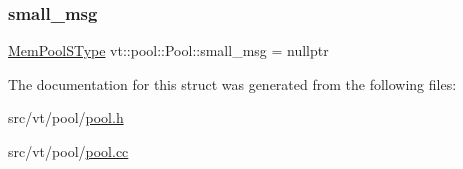 \mbox{\label{structvt_1_1pool_1_1_pool_a8f14f2f9b344882cf727200eb8d41845}} 
\subsubsection{\texorpdfstring{small\+\_\+msg}{small\_msg}}
{\footnotesize\ttfamily \hyperlink{structvt_1_1pool_1_1_pool_a9f94985824d12c43357cfe50eaaefd38}{Mem\+Pool\+S\+Type} vt\+::pool\+::\+Pool\+::small\+\_\+msg = nullptr\hspace{0.3cm}{\ttfamily [private]}}



The documentation for this struct was generated from the following files\+:\begin{DoxyCompactItemize}
\item 
src/vt/pool/\hyperlink{pool_8h}{pool.\+h}\item 
src/vt/pool/\hyperlink{pool_8cc}{pool.\+cc}\end{DoxyCompactItemize}
